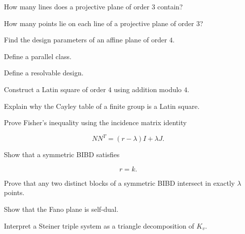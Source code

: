 \begin{exercise}[2]
How many lines does a projective plane of order \(3\) contain?
\end{exercise}

\begin{exercise}[2]
How many points lie on each line of a projective plane of order \(3\)?
\end{exercise}

\begin{exercise}[2]
Find the design parameters of an affine plane of order \(4\).
\end{exercise}

\begin{exercise}[2]
Define a parallel class.
\end{exercise}

\begin{exercise}[2]
Define a resolvable design.
\end{exercise}

\begin{exercise}[2]
Construct a Latin square of order \(4\) using addition modulo \(4\).
\end{exercise}

\begin{exercise}[2]
Explain why the Cayley table of a finite group is a Latin square.
\end{exercise}

\begin{exercise}[3]
Prove Fisher's inequality using the incidence matrix identity

\[
NN^T
=
(r-\lambda)I+\lambda J.
\]
\end{exercise}

\begin{exercise}[3]
Show that a symmetric BIBD satisfies

\[
r=k.
\]
\end{exercise}

\begin{exercise}[3]
Prove that any two distinct blocks of a symmetric BIBD intersect in
exactly \(\lambda\) points.
\end{exercise}

\begin{exercise}[3]
Show that the Fano plane is self-dual.
\end{exercise}

\begin{exercise}[3]
Interpret a Steiner triple system as a triangle decomposition of
\(K_v\).
\end{exercise}

